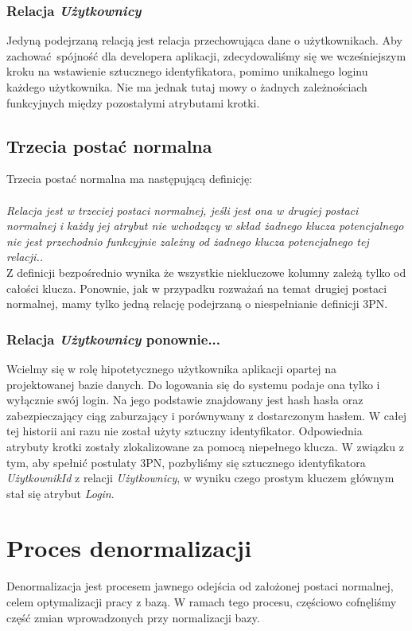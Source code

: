 \documentclass{mwrep}
\begin{document}
\subsubsection{Relacja \emph{Użytkownicy}}
Jedyną podejrzaną relacją jest relacja przechowująca dane o użytkownikach. Aby zachować spójność dla developera aplikacji, zdecydowaliśmy się 
we wcześniejszym kroku na wstawienie sztucznego identyfikatora, pomimo unikalnego loginu każdego użytkownika. Nie ma jednak 
tutaj mowy o żadnych zależnościach funkcyjnych między pozostałymi atrybutami krotki.

\subsection{Trzecia postać normalna}
Trzecia postać normalna ma następującą definicję:\\
\\
\emph{Relacja jest w trzeciej postaci normalnej, jeśli jest ona w drugiej
postaci normalnej i każdy jej atrybut nie wchodzący w skład żadnego
klucza potencjalnego nie jest przechodnio funkcyjnie zależny
od żadnego klucza potencjalnego tej relacji.\cite{Kowalczyk1}.}\\

Z definicji bezpośrednio wynika że wszystkie niekluczowe kolumny zależą tylko od całości klucza. Ponownie, jak w przypadku rozważań 
na temat drugiej postaci normalnej, mamy tylko jedną relację podejrzaną o niespełnianie definicji 3PN.

\subsubsection{Relacja \emph{Użytkownicy} ponownie...}
Wcielmy się w rolę hipotetycznego użytkownika aplikacji opartej na projektowanej bazie danych. Do logowania się 
do systemu podaje ona tylko i wyłącznie swój login. Na jego podstawie znajdowany jest hash hasła oraz zabezpieczający
ciąg zaburzający i porównywany z dostarczonym hasłem. W całej tej historii ani razu nie został użyty sztuczny identyfikator. 
Odpowiednia atrybuty krotki zostały zlokalizowane za pomocą niepełnego klucza. W związku z tym, aby spełnić postulaty 3PN, pozbyliśmy się
sztucznego identyfikatora \emph{UżytkownikId} z relacji \emph{Użytkownicy}, w wyniku czego prostym kluczem głównym stał się atrybut \emph{Login}.

\section{Proces denormalizacji}
Denormalizacja jest procesem jawnego odejścia od założonej postaci normalnej, celem optymalizacji pracy z bazą.
W ramach tego procesu, częściowo cofnęliśmy część zmian wprowadzonych przy normalizacji bazy.
\end{document}
